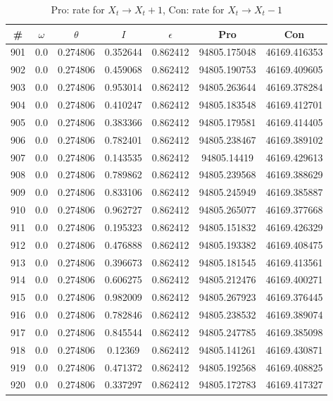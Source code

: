 \newpage
\begin{table}
\caption{Pro: rate for $X_t \rightarrow X_t + 1$, Con: rate for $X_t \rightarrow X_t - 1$}
\begin{tabular*}{\linewidth}{c|c|c|c|c|c|c}
\# & $\omega$ & $\theta$ & $I$ & $\epsilon$ & Pro & Con \\
\hline
901 & 0.0 & 0.274806 & 0.352644 & 0.862412 & 94805.175048 & 46169.416353\\
902 & 0.0 & 0.274806 & 0.459068 & 0.862412 & 94805.190753 & 46169.409605\\
903 & 0.0 & 0.274806 & 0.953014 & 0.862412 & 94805.263644 & 46169.378284\\
904 & 0.0 & 0.274806 & 0.410247 & 0.862412 & 94805.183548 & 46169.412701\\
905 & 0.0 & 0.274806 & 0.383366 & 0.862412 & 94805.179581 & 46169.414405\\
906 & 0.0 & 0.274806 & 0.782401 & 0.862412 & 94805.238467 & 46169.389102\\
907 & 0.0 & 0.274806 & 0.143535 & 0.862412 & 94805.14419 & 46169.429613\\
908 & 0.0 & 0.274806 & 0.789862 & 0.862412 & 94805.239568 & 46169.388629\\
909 & 0.0 & 0.274806 & 0.833106 & 0.862412 & 94805.245949 & 46169.385887\\
910 & 0.0 & 0.274806 & 0.962727 & 0.862412 & 94805.265077 & 46169.377668\\
911 & 0.0 & 0.274806 & 0.195323 & 0.862412 & 94805.151832 & 46169.426329\\
912 & 0.0 & 0.274806 & 0.476888 & 0.862412 & 94805.193382 & 46169.408475\\
913 & 0.0 & 0.274806 & 0.396673 & 0.862412 & 94805.181545 & 46169.413561\\
914 & 0.0 & 0.274806 & 0.606275 & 0.862412 & 94805.212476 & 46169.400271\\
915 & 0.0 & 0.274806 & 0.982009 & 0.862412 & 94805.267923 & 46169.376445\\
916 & 0.0 & 0.274806 & 0.782846 & 0.862412 & 94805.238532 & 46169.389074\\
917 & 0.0 & 0.274806 & 0.845544 & 0.862412 & 94805.247785 & 46169.385098\\
918 & 0.0 & 0.274806 & 0.12369 & 0.862412 & 94805.141261 & 46169.430871\\
919 & 0.0 & 0.274806 & 0.471372 & 0.862412 & 94805.192568 & 46169.408825\\
920 & 0.0 & 0.274806 & 0.337297 & 0.862412 & 94805.172783 & 46169.417327\\

\end{tabular*}
\end{table}
